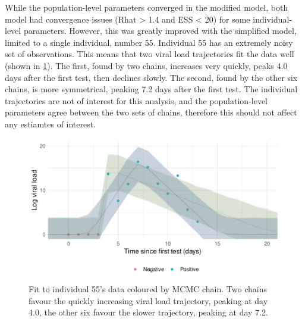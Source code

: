 \documentclass[thesis.tex]{subfiles}
\begin{document}
While the population-level parameters converged in the modified model, both model had convergence issues (Rhat > 1.4 and ESS < 20) for some individual-level parameters.
However, this was greatly improved with the simplified model, limited to a single individual, number 55.
Individual 55 has an extremely noisy set of observations.
This means that two viral load trajectories fit the data well (shown in \cref{ATACCC:fig:individual-55}).
The first, found by two chains, increases very quickly, peaks 4.0 days after the first test, then declines slowly.
The second, found by the other six chains, is more symmetrical, peaking 7.2 days after the first test.
The individual trajectories are not of interest for this analysis, and the population-level parameters agree between the two sets of chains, therefore this should not affect any estiamtes of interest.
\begin{figure}
  \centering \includegraphics{ATACCC/fit_individual_55}
  \caption[Goodness-of-fit for individual 55]{Fit to individual 55's data coloured by MCMC chain. Two chains favour the quickly increasing viral load trajectory, peaking at day 4.0, the other six favour the slower trajectory, peaking at day 7.2. \label{ATACCC:fig:individual-55}}
\end{figure}
\end{document}
